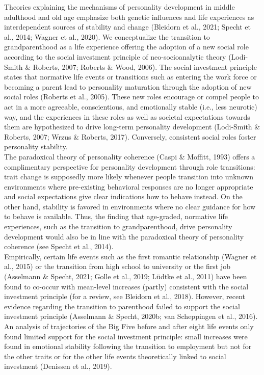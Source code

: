 \documentclass[
  english,
  man, noextraspace]{apa7}
\begin{document}
Theories explaining the mechanisms of personality development in middle adulthood and old age emphasize both genetic influences and life experiences as interdependent sources of stability and change (Bleidorn et al., 2021; Specht et al., 2014; Wagner et al., 2020). We conceptualize the transition to grandparenthood as a life experience offering the adoption of a new social role according to the social investment principle of neo-socioanalytic theory (Lodi-Smith \& Roberts, 2007; Roberts \& Wood, 2006). The social investment principle states that normative life events or transitions such as entering the work force or becoming a parent lead to personality maturation through the adoption of new social roles (Roberts et al., 2005). These new roles encourage or compel people to act in a more agreeable, conscientious, and emotionally stable (i.e., less neurotic) way, and the experiences in these roles as well as societal expectations towards them are hypothesized to drive long-term personality development (Lodi-Smith \& Roberts, 2007; Wrzus \& Roberts, 2017). Conversely, consistent social roles foster personality stability.\\
The paradoxical theory of personality coherence (Caspi \& Moffitt, 1993) offers a complimentary perspective for personality development through role transitions: trait change is supposedly more likely whenever people transition into unknown environments where pre-existing behavioral responses are no longer appropriate and social expectations give clear indications how to behave instead. On the other hand, stability is favored in environments where no clear guidance for how to behave is available. Thus, the finding that age-graded, normative life experiences, such as the transition to grandparenthood, drive personality development would also be in line with the paradoxical theory of personality coherence (see Specht et al., 2014).\\
Empirically, certain life events such as the first romantic relationship (Wagner et al., 2015) or the transition from high school to university or the first job (Asselmann \& Specht, 2021; Golle et al., 2019; Lüdtke et al., 2011) have been found to co-occur with mean-level increases (partly) consistent with the social investment principle (for a review, see Bleidorn et al., 2018). However, recent evidence regarding the transition to parenthood failed to support the social investment principle (Asselmann \& Specht, 2020b; van Scheppingen et al., 2016). An analysis of trajectories of the Big Five before and after eight life events only found limited support for the social investment principle: small increases were found in emotional stability following the transition to employment but not for the other traits or for the other life events theoretically linked to social investment (Denissen et al., 2019).\\
\end{document}
